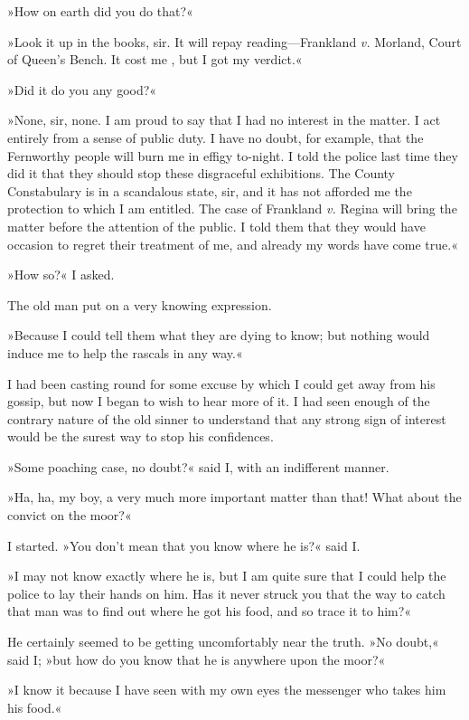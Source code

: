 »How on earth did you do that?«

»Look it up in the books, sir. It will repay reading\allowbreak---\allowbreak Frankland \textit{v.} Morland, Court of Queen's Bench. It cost me , but I got my verdict.«

»Did it do you any good?«

»None, sir, none. I am proud to say that I had no interest in the matter. I act entirely from a sense of public duty. I have no doubt, for example, that the Fernworthy people will burn me in effigy to-night. I told the police last time they did it that they should stop these disgraceful exhibitions. The County Constabulary is in a scandalous state, sir, and it has not afforded me the protection to which I am entitled. The case of Frankland \textit{v.} Regina will bring the matter before the attention of the public. I told them that they would have occasion to regret their treatment of me, and already my words have come true.«

»How so?« I asked.

The old man put on a very knowing expression.

»Because I could tell them what they are dying to know; but nothing would induce me to help the rascals in any way.«

I had been casting round for some excuse by which I could get away from his gossip, but now I began to wish to hear more of it. I had seen enough of the contrary nature of the old sinner to understand that any strong sign of interest would be the surest way to stop his confidences.

»Some poaching case, no doubt?« said I, with an indifferent manner.

»Ha, ha, my boy, a very much more important matter than that! What about the convict on the moor?«

I started. »You don't mean that you know where he is?« said I.

»I may not know exactly where he is, but I am quite sure that I could help the police to lay their hands on him. Has it never struck you that the way to catch that man was to find out where he got his food, and so trace it to him?«

He certainly seemed to be getting uncomfortably near the truth. »No doubt,« said I; »but how do you know that he is anywhere upon the moor?«

»I know it because I have seen with my own eyes the messenger who takes him his food.«

